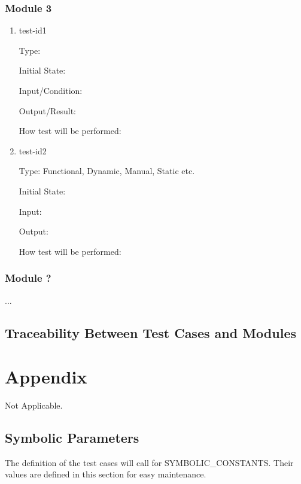 \documentclass[12pt, titlepage]{article}
\begin{document}
\subsubsection{Module 3}
		
\begin{enumerate}

\item{test-id1\\}

Type: 
					
Initial State: 
					
Input/Condition: 
					
Output/Result: 
					
How test will be performed: 
					
\item{test-id2\\}

Type: Functional, Dynamic, Manual, Static etc.
					
Initial State: 
					
Input: 
					
Output: 
					
How test will be performed: 

\end{enumerate}

\subsubsection{Module ?}

...

\subsection{Traceability Between Test Cases and Modules}

				




\newpage

\section{Appendix}
Not Applicable.

\subsection{Symbolic Parameters}
The definition of the test cases will call for SYMBOLIC\_CONSTANTS.
Their values are defined in this section for easy maintenance.
\end{document}
